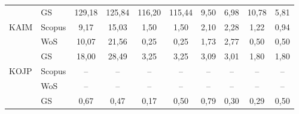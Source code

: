 \begin{table}
\begin{tabular}{llcccccccc}
      & GS     & 129,18 & 125,84 & 116,20 & 115,44 & 9,50     & 6,98 & 10,78 & 5,81 \\[1ex]
 KAIM & Scopus & 9,17   & 15,03  & 1,50   & 1,50   & 2,10     & 2,28 & 1,22  & 0,94 \\
      & WoS    & 10,07  & 21,56  & 0,25   & 0,25   & 1,73     & 2,77 & 0,50  & 0,50 \\
      & GS     & 18,00  & 28,49  & 3,25   & 3,25   & 3,09     & 3,01 & 1,80  & 1,80 \\[1ex]
 KOJP & Scopus & --     & --     & --     & --     & --       & --   & --    & --   \\
      & WoS    & --     & --     & --     & --     & --       & --   & --    & --   \\
      & GS     & 0,67   & 0,47   & 0,17   & 0,50   & 0,79     & 0,30 & 0,29  & 0,50 \\[0.5ex]
  \bottomrule
\end{tabular}
\end{table}

